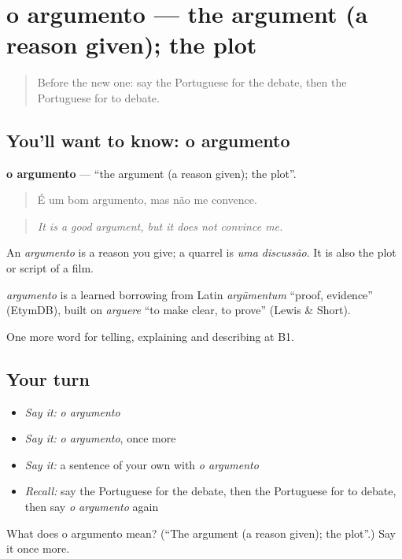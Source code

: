 \section[o argumento]{o argumento — the argument (a reason given); the plot}

\label{lesson:PT-C336-argumento}



\begin{quote}
Before the new one: say the Portuguese for the debate, then the Portuguese for to debate.
\end{quote}

\subsection*{You'll want to know: o argumento}
\textbf{o argumento} — \textquotedblleft{}the argument (a reason given); the plot\textquotedblright{}.

\begin{quote}
É um bom argumento, mas não me convence.
\end{quote}

\begin{quote}
\emph{It is a good argument, but it does not convince me.}
\end{quote}

An \emph{argumento} is a reason you give; a quarrel is \emph{uma discussão}. It is also the plot or script of a film.

\begin{cousinweb}
\emph{argumento} is a learned borrowing from Latin \emph{argūmentum} \textquotedblleft{}proof, evidence\textquotedblright{} (EtymDB), built on \emph{arguere} \textquotedblleft{}to make clear, to prove\textquotedblright{} (Lewis \& Short).
\end{cousinweb}

\begin{grammarlens}[title={What you've built}]
One more word for telling, explaining and describing at B1.
\end{grammarlens}

\subsection*{Your turn}
\begin{itemize}
\raggedright
  \item \emph{Say it:} \emph{o argumento}
  \item \emph{Say it:} \emph{o argumento}, once more
  \item \emph{Say it:} a sentence of your own with \emph{o argumento}
  \item \emph{Recall:} say the Portuguese for the debate, then the Portuguese for to debate, then say \emph{o argumento} again
\end{itemize}

\begin{tcolorbox}[breakable,colback=teal!4,colframe=teal!35!black,title={Before you move on}]
What does o argumento mean? (\textquotedblleft{}The argument (a reason given); the plot\textquotedblright{}.) Say it once more.
\end{tcolorbox}
